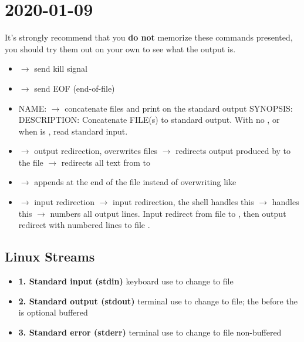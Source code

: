 \section{2020-01-09}
It's strongly recommend that you \textbf{do not} memorize these commands presented,
you should try them out on your own to see what the output is.

\begin{itemize}
    \item {} $ \rightarrow $ send kill signal
    \item {} $ \rightarrow $ send EOF (end-of-file)
    \item NAME:  $ \rightarrow $ concatenate files and print on the standard output
    \subitem SYNOPSIS: 
    \subitem DESCRIPTION: Concatenate FILE(s) to standard output.
    With no , or when  is \code{-}, read standard input.
    \item \code{>} $ \rightarrow $ output redirection, overwrites files
    \subitem {} $ \rightarrow $ redirects output produced by
     to the file 
    \subitem {} $ \rightarrow $ redirects all text from 
     to 
    \item \code{>{}>} $ \rightarrow $ appends at the end of the file instead of overwriting like 
    \code{>}
    \item \code{<} $ \rightarrow $ input redirection
    \subitem {} $ \rightarrow $
    input redirection, the shell handles this
    \subitem {} $ \rightarrow $
     handles this
    \subitem {} $ \rightarrow $
     numbers all output lines. Input redirect from file  to
    , then output redirect with numbered lines to file .
\end{itemize}

\subsection{Linux Streams}

\begin{itemize}
    \item \textbf{1. Standard input (stdin)}
    \subitem keyboard
    \subitem use \code{<} to change to file
    \item \textbf{2. Standard output (stdout)}
    \subitem terminal
    \subitem use  to change to file; the  before the \code{>} 
    is optional
    \subitem buffered
    \item \textbf{3. Standard error (stderr)}
    \subitem terminal
    \subitem use  to change to file
    \subitem non-buffered
\end{itemize}

